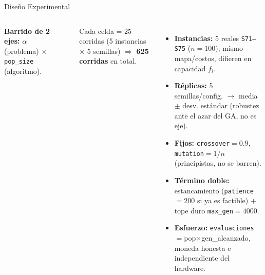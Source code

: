\documentclass[aspectratio=169, 12pt]{beamer}
\newcommand{\acento}[1]{\textcolor{Verde}{\textbf{#1}}}
\newcommand{\gris}[1]{\textcolor{GrisAzul}{#1}}
\begin{document}
\begin{frame}{Diseño Experimental}
  \begin{columns}[T]
    \textbf{\footnotesize Barrido de 2 ejes:} $\alpha$ (problema) $\times$ \texttt{pop\_size} (algoritmo).
    \vspace{0.2em}
    \begin{center}
    \end{center}
    \gris{\scriptsize Cada celda = 25 corridas (5 instancias $\times$ 5 semillas) $\Rightarrow$ \textbf{625 corridas} en total.}

    \scriptsize
    \begin{itemize}[itemsep=4pt,topsep=2pt,parsep=0pt,leftmargin=1.1em]
      \item \acento{Instancias:} 5 reales \texttt{S71--S75} ($n{=}100$); mismo mapa/costos, difieren en capacidad $f_i$.
      \item \acento{Réplicas:} 5 semillas/config. $\rightarrow$ media $\pm$ desv. estándar (robustez ante el azar del GA, no es eje).
      \item \acento{Fijos:} \texttt{crossover}$=0.9$, \texttt{mutation}$=1/n$ (principistas, no se barren).
      \item \acento{Término doble:} estancamiento (\texttt{patience}$=200$ si ya es factible) $+$ tope duro \texttt{max\_gen}$=4000$.
      \item \acento{Esfuerzo:} \texttt{evaluaciones}$=$pop$\times$gen\_alcanzado, moneda honesta e independiente del hardware.
    \end{itemize}
  \end{columns}
\end{frame}
\end{document}
